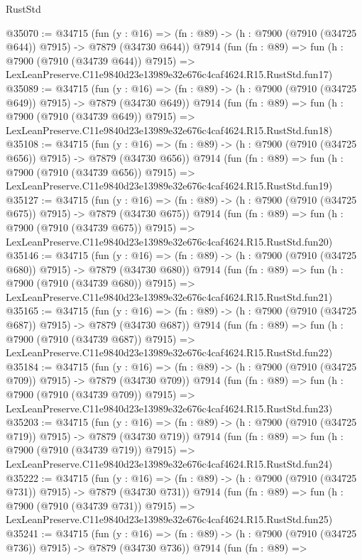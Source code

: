 \begin{lexlean}{RustStd}
\begin{coremodule}
@35070 := @34715
    (fun (y : @16) => (fn : @89) -> (h : @7900 (@7910 (@34725 @644)) @7915) -> @7879 (@34730 @644))
    @7914
    (fun (fn : @89) =>
    fun (h : @7900 (@7910 (@34739 @644)) @7915) =>
    LexLeanPreserve.C11e9840d23e13989e32e676c4caf4624.R15.RustStd.fun17)
@35089 := @34715
    (fun (y : @16) => (fn : @89) -> (h : @7900 (@7910 (@34725 @649)) @7915) -> @7879 (@34730 @649))
    @7914
    (fun (fn : @89) =>
    fun (h : @7900 (@7910 (@34739 @649)) @7915) =>
    LexLeanPreserve.C11e9840d23e13989e32e676c4caf4624.R15.RustStd.fun18)
@35108 := @34715
    (fun (y : @16) => (fn : @89) -> (h : @7900 (@7910 (@34725 @656)) @7915) -> @7879 (@34730 @656))
    @7914
    (fun (fn : @89) =>
    fun (h : @7900 (@7910 (@34739 @656)) @7915) =>
    LexLeanPreserve.C11e9840d23e13989e32e676c4caf4624.R15.RustStd.fun19)
@35127 := @34715
    (fun (y : @16) => (fn : @89) -> (h : @7900 (@7910 (@34725 @675)) @7915) -> @7879 (@34730 @675))
    @7914
    (fun (fn : @89) =>
    fun (h : @7900 (@7910 (@34739 @675)) @7915) =>
    LexLeanPreserve.C11e9840d23e13989e32e676c4caf4624.R15.RustStd.fun20)
@35146 := @34715
    (fun (y : @16) => (fn : @89) -> (h : @7900 (@7910 (@34725 @680)) @7915) -> @7879 (@34730 @680))
    @7914
    (fun (fn : @89) =>
    fun (h : @7900 (@7910 (@34739 @680)) @7915) =>
    LexLeanPreserve.C11e9840d23e13989e32e676c4caf4624.R15.RustStd.fun21)
@35165 := @34715
    (fun (y : @16) => (fn : @89) -> (h : @7900 (@7910 (@34725 @687)) @7915) -> @7879 (@34730 @687))
    @7914
    (fun (fn : @89) =>
    fun (h : @7900 (@7910 (@34739 @687)) @7915) =>
    LexLeanPreserve.C11e9840d23e13989e32e676c4caf4624.R15.RustStd.fun22)
@35184 := @34715
    (fun (y : @16) => (fn : @89) -> (h : @7900 (@7910 (@34725 @709)) @7915) -> @7879 (@34730 @709))
    @7914
    (fun (fn : @89) =>
    fun (h : @7900 (@7910 (@34739 @709)) @7915) =>
    LexLeanPreserve.C11e9840d23e13989e32e676c4caf4624.R15.RustStd.fun23)
@35203 := @34715
    (fun (y : @16) => (fn : @89) -> (h : @7900 (@7910 (@34725 @719)) @7915) -> @7879 (@34730 @719))
    @7914
    (fun (fn : @89) =>
    fun (h : @7900 (@7910 (@34739 @719)) @7915) =>
    LexLeanPreserve.C11e9840d23e13989e32e676c4caf4624.R15.RustStd.fun24)
@35222 := @34715
    (fun (y : @16) => (fn : @89) -> (h : @7900 (@7910 (@34725 @731)) @7915) -> @7879 (@34730 @731))
    @7914
    (fun (fn : @89) =>
    fun (h : @7900 (@7910 (@34739 @731)) @7915) =>
    LexLeanPreserve.C11e9840d23e13989e32e676c4caf4624.R15.RustStd.fun25)
@35241 := @34715
    (fun (y : @16) => (fn : @89) -> (h : @7900 (@7910 (@34725 @736)) @7915) -> @7879 (@34730 @736))
    @7914
    (fun (fn : @89) =>

\end{coremodule}
\end{lexlean}
